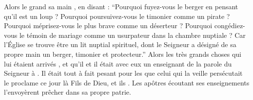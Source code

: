 Alors le grand  sa main , en disant :
\enquote{Pourquoi fuyez-vous le berger en pensant qu'il est un loup ?
Pourquoi poursuivez-vous le timonier comme un pirate ? %
Pourquoi méprisez-vous le plus brave comme un déserteur ?
Pourquoi congédiez-vous le témoin de mariage comme un usurpateur dans la chambre nuptiale ?  %
Car l'Église se trouve être un lit nuptial spirituel, dont le Seigneur a désigné de sa propre main un  berger, timonier et protecteur.}  %
Alors    les  très  grands choses qui lui étaient arrivés , et qu'il  et il était avec eux un enseignant de la parole du Seigneur à .
Il était tout à fait pesant pour les  que celui qui la veille persécutait  le proclame ce jour là Fils de Dieu, et ils  . 
Les apôtres écoutant ses enseignements l'envoyèrent prêcher dans sa propre patrie. %




